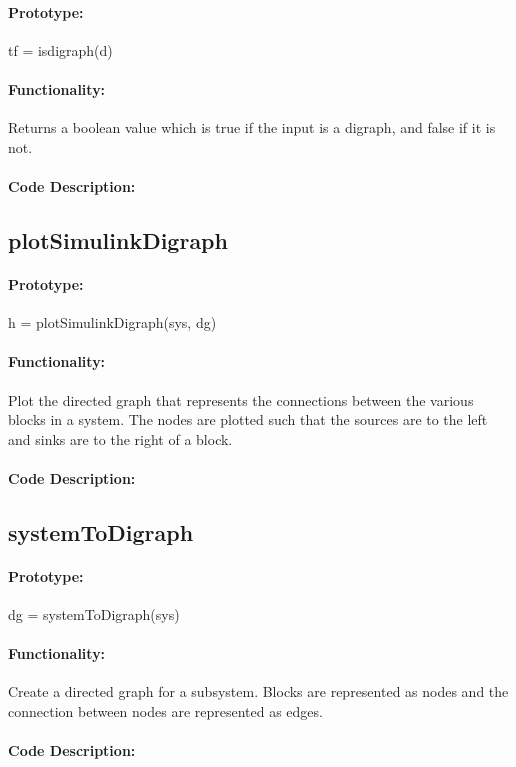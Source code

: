 \documentclass[12pt,letterpaper]{report}
\begin{document}
\paragraph{Prototype:} tf = isdigraph(d)
\paragraph{Functionality:} Returns a boolean value which is true if the input is a digraph, and false if it is not.
\paragraph{Code Description:}

\subsection{plotSimulinkDigraph}
\paragraph{Prototype:} h = plotSimulinkDigraph(sys, dg)
\paragraph{Functionality:} Plot  the directed graph that represents the connections between the various blocks in a system. The nodes are plotted such that the sources are to the left and sinks are to the right of a block.
\paragraph{Code Description:}

\subsection{systemToDigraph}
\paragraph{Prototype:} dg  = systemToDigraph(sys)
\paragraph{Functionality:} Create a directed graph for a subsystem. Blocks are represented as nodes and the connection between nodes are represented as edges.
\paragraph{Code Description:}
\end{document}
